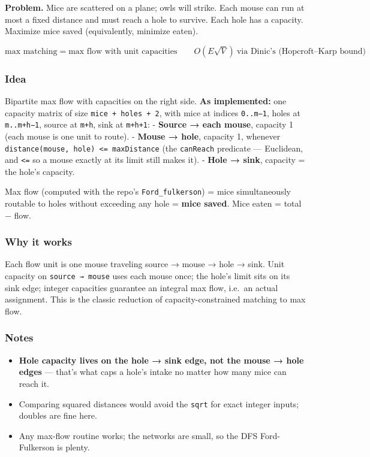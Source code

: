 \documentclass[
  10pt,
  letterpaper,
  onecolumn]{article}
\providecommand{\tightlist}{%
  \setlength{\itemsep}{0pt}\setlength{\parskip}{0pt}}
\begin{document}
\textbf{Problem.} Mice are scattered on a plane; owls will strike. Each
mouse can run at most a fixed distance and must reach a hole to survive.
Each hole has a capacity. Maximize mice saved (equivalently, minimize
eaten).

\begin{equation*}
\text{max matching} = \text{max flow with unit capacities}
\qquad
O(E\sqrt{V})\ \text{via Dinic's (Hopcroft--Karp bound)}
\end{equation*}

\hypertarget{idea-18}{%
\subsubsection{Idea}\label{idea-18}}

Bipartite max flow with capacities on the right side. \textbf{As
implemented:} one capacity matrix of size \texttt{mice\ +\ holes\ +\ 2},
with mice at indices \texttt{0..m−1}, holes at \texttt{m..m+h−1}, source
at \texttt{m+h}, sink at \texttt{m+h+1}: - \textbf{Source → each mouse},
capacity 1 (each mouse is one unit to route). - \textbf{Mouse → hole},
capacity 1, whenever
\texttt{distance(mouse,\ hole)\ \textless{}=\ maxDistance} (the
\texttt{canReach} predicate --- Euclidean, and \texttt{\textless{}=} so
a mouse exactly at its limit still makes it). - \textbf{Hole → sink},
capacity = the hole's capacity.

Max flow (computed with the repo's \texttt{Ford\_fulkerson}) = mice
simultaneously routable to holes without exceeding any hole =
\textbf{mice saved}. Mice eaten = total − flow.

\hypertarget{why-it-works}{%
\subsubsection{Why it works}\label{why-it-works}}

Each flow unit is one mouse traveling source → mouse → hole → sink. Unit
capacity on \texttt{source\ →\ mouse} uses each mouse once; the hole's
limit sits on its sink edge; integer capacities guarantee an integral
max flow, i.e.~an actual assignment. This is the classic reduction of
capacity-constrained matching to max flow.

\hypertarget{notes-16}{%
\subsubsection{Notes}\label{notes-16}}

\begin{itemize}
\tightlist
\item
  \textbf{Hole capacity lives on the hole → sink edge, not the mouse →
  hole edges} --- that's what caps a hole's intake no matter how many
  mice can reach it.
\item
  Comparing squared distances would avoid the \texttt{sqrt} for exact
  integer inputs; doubles are fine here.
\item
  Any max-flow routine works; the networks are small, so the DFS
  Ford-Fulkerson is plenty.
\end{itemize}
\end{document}
